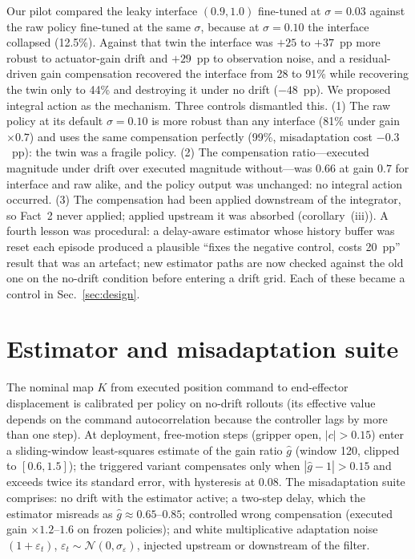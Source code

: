 \documentclass{article}
\begin{document}
Our pilot compared the leaky interface $(0.9,1.0)$ fine-tuned at $\sigma=0.03$ against the raw policy fine-tuned at the same $\sigma$, because at $\sigma=0.10$ the interface collapsed (12.5\%). Against that twin the interface was $+25$ to $+37$~pp more robust to actuator-gain drift and $+29$~pp to observation noise, and a residual-driven gain compensation recovered the interface from 28 to 91\% while recovering the twin only to 44\% and destroying it under no drift ($-48$~pp). We proposed integral action as the mechanism. Three controls dismantled this. (1) The raw policy at its default $\sigma=0.10$ is more robust than any interface (81\% under gain $\times0.7$) and uses the same compensation perfectly (99\%, misadaptation cost $-0.3$~pp): the twin was a fragile policy. (2) The compensation ratio---executed magnitude under drift over executed magnitude without---was $0.66$ at gain $0.7$ for interface and raw alike, and the policy output was unchanged: no integral action occurred. (3) The compensation had been applied downstream of the integrator, so Fact~2 never applied; applied upstream it was absorbed (corollary~(iii)). A fourth lesson was procedural: a delay-aware estimator whose history buffer was reset each episode produced a plausible ``fixes the negative control, costs 20~pp'' result that was an artefact; new estimator paths are now checked against the old one on the no-drift condition before entering a drift grid. Each of these became a control in Sec.~\ref{sec:design}.

\section{Estimator and misadaptation suite}
\label{app:estimator}
The nominal map $K$ from executed position command to end-effector displacement is calibrated per policy on no-drift rollouts (its effective value depends on the command autocorrelation because the controller lags by more than one step). At deployment, free-motion steps (gripper open, $|c|>0.15$) enter a sliding-window least-squares estimate of the gain ratio $\hat g$ (window 120, clipped to $[0.6,1.5]$); the triggered variant compensates only when $|\hat g-1|>0.15$ and exceeds twice its standard error, with hysteresis at $0.08$. The misadaptation suite comprises: no drift with the estimator active; a two-step delay, which the estimator misreads as $\hat g\approx0.65$--$0.85$; controlled wrong compensation (executed gain $\times1.2$--$1.6$ on frozen policies); and white multiplicative adaptation noise $(1+\varepsilon_t)$, $\varepsilon_t\sim\mathcal N(0,\sigma_\varepsilon)$, injected upstream or downstream of the filter.
\end{document}
